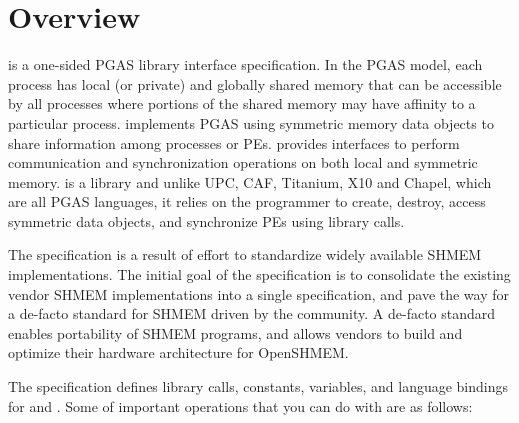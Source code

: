 \section{Overview}
\openshmem{} is a one-sided \ac{PGAS} library interface specification. In the \ac{PGAS} model, each process has local (or private) and 
globally shared memory that can be accessible by all processes where portions of the shared memory may have affinity to a particular process. 
\openshmem{} implements \ac{PGAS} using symmetric memory data objects to share information among processes or \ac{PE}s.   
\openshmem{} provides interfaces to perform communication and synchronization operations on both local and symmetric memory. 
\openshmem{} is a library and unlike UPC, CAF, Titanium, X10 and Chapel, which are all
PGAS languages, it relies on the programmer to create, destroy, access symmetric data objects, and synchronize \ac{PE}s using library calls.

The \openshmem specification is a result of effort to standardize widely available SHMEM implementations. 
The initial goal of the specification is to consolidate the existing vendor SHMEM implementations into a single specification, and  pave the way for 
a de-facto standard for SHMEM driven by the \openshmem community. A de-facto standard enables portability of SHMEM programs, and 
allows vendors to build and optimize their hardware architecture for OpenSHMEM.

The \openshmem specification defines library calls, constants, variables, and language bindings for \Clang{} and \Fortran{}.
Some of important \openshmem{} operations that you can do with \openshmem are as follows:

